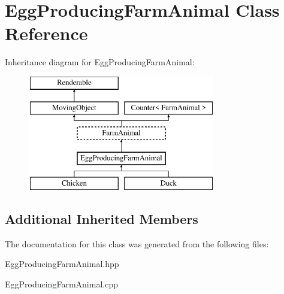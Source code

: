 \hypertarget{class_egg_producing_farm_animal}{}\section{Egg\+Producing\+Farm\+Animal Class Reference}
\label{class_egg_producing_farm_animal}
Inheritance diagram for Egg\+Producing\+Farm\+Animal\+:\begin{figure}[H]
\begin{center}
\leavevmode
\includegraphics[height=5.000000cm]{class_egg_producing_farm_animal}
\end{center}
\end{figure}
\subsection*{Additional Inherited Members}


The documentation for this class was generated from the following files\+:\begin{DoxyCompactItemize}
\item 
Egg\+Producing\+Farm\+Animal.\+hpp\item 
Egg\+Producing\+Farm\+Animal.\+cpp\end{DoxyCompactItemize}
